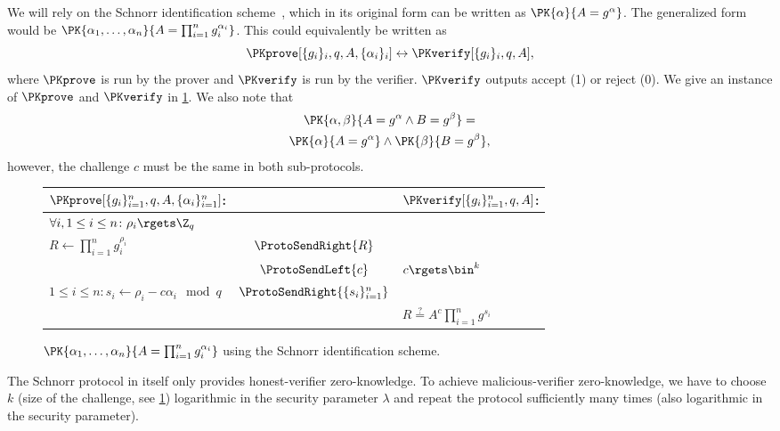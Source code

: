 We will rely on the Schnorr identification scheme~\cite{Schnorr}, which in its 
original form can be written as \(\PK{\alpha}{A = g^\alpha}\).
The generalized form would be \(\PK{\alpha_1, \dotsc, \alpha_n}{A = 
    \prod_{i=1}^n g_i^{\alpha_i}}\).
This could equivalently be written as
\begin{equation*}
  \PKprove[\{g_i\}_i, q, A, \{\alpha_i\}_i] \leftrightarrow
  \PKverify[\{g_i\}_i, q, A],
\end{equation*}
where \(\PKprove\) is run by the prover and \(\PKverify\) is run by the 
verifier.
\(\PKverify\) outputs accept (1) or reject (0).
We give an instance of \(\PKprove\) and \(\PKverify\) in \cref{PKalgorithms}.
We also note that
\begin{multline*}
  \PK{\alpha, \beta}{A = g^\alpha \land B = g^\beta} = \\
  \PK{\alpha}{A = g^\alpha} \land \PK{\beta}{B = g^\beta},
\end{multline*}
however, the challenge \(c\) must be the same in both sub-protocols.

\begin{figure*}
  \centering
  \begin{tabular}{lcl}
    \(\PKprove[\{g_i\}_{i=1}^n, q, A, \{\alpha_i\}_{i=1}^n]\):
    &
    & \(\PKverify[\{g_i\}_{i=1}^n, q, A]\):
    \\
    \midrule

    \(\forall i, 1\leq i\leq n\colon \rho_i\rgets \Z_q\)
    &
    &
    \\

    \(R\gets \prod_{i=1}^n g_i^{\rho_i}\)
    & \(\ProtoSendRight{R}\)
    &
    \\

    & \(\ProtoSendLeft{c}\)
    & \(c\rgets \bin^k\)
    \\

    \(1\leq i\leq n\colon s_i\gets \rho_i - c\alpha_i \mod q\)
    & \(\ProtoSendRight{\{s_i\}_{i=1}^n}\)
    &
    \\

    &
    & \(R \stackrel{?}{=} A^c \prod_{i=1}^n g^{s_i}\)
    \\
    
  \end{tabular}
  \caption{%
    \(\PK{\alpha_1, \dotsc, \alpha_n}{A = \prod_{i=1}^n g_i^{\alpha_i}}\) using 
    the Schnorr identification scheme.
  }%
  \label{PKalgorithms}
\end{figure*}

The Schnorr protocol in itself only provides honest-verifier zero-knowledge.
To achieve malicious-verifier zero-knowledge, we have to choose \(k\) (size of 
the challenge, see \cref{PKalgorithms}) logarithmic in the security parameter 
\(\lambda\) and repeat the protocol sufficiently many times (also logarithmic in 
the security parameter).

